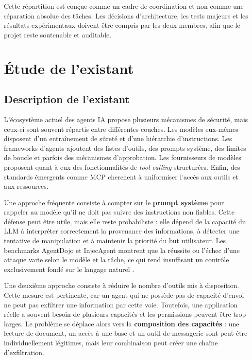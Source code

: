 Cette répartition est conçue comme un cadre de coordination et non comme une séparation absolue des tâches. Les décisions d'architecture, les tests majeurs et les résultats expérimentaux doivent être compris par les deux membres, afin que le projet reste soutenable et auditable.

\section{Étude de l'existant}

\subsection{Description de l'existant}

L'écosystème actuel des agents IA propose plusieurs mécanismes de sécurité, mais ceux-ci sont souvent répartis entre différentes couches. Les modèles eux-mêmes disposent d'un entraînement de sûreté et d'une hiérarchie d'instructions. Les frameworks d'agents ajoutent des listes d'outils, des prompts système, des limites de boucle et parfois des mécanismes d'approbation. Les fournisseurs de modèles proposent quant à eux des fonctionnalités de \textit{tool calling} structurées. Enfin, des standards émergents comme MCP cherchent à uniformiser l'accès aux outils et aux ressources.

Une approche fréquente consiste à compter sur le \textbf{prompt système} pour rappeler au modèle qu'il ne doit pas suivre des instructions non fiables. Cette défense peut être utile, mais elle reste probabiliste : elle dépend de la capacité du LLM à interpréter correctement la provenance des informations, à détecter une tentative de manipulation et à maintenir la priorité du but utilisateur. Les benchmarks AgentDojo et InjecAgent montrent que la réussite ou l'échec d'une attaque varie selon le modèle et la tâche, ce qui rend insuffisant un contrôle exclusivement fondé sur le langage naturel \cite{injecagent,agentdojo}.

Une deuxième approche consiste à réduire le nombre d'outils mis à disposition. Cette mesure est pertinente, car un agent qui ne possède pas de capacité d'envoi ne peut pas exfiltrer une information par cette voie. Toutefois, une application réelle a souvent besoin de plusieurs capacités et les permissions peuvent être trop larges. Le problème se déplace alors vers la \textbf{composition des capacités} : une lecture de document, un accès à une base et un outil de messagerie sont peut-être individuellement légitimes, mais leur combinaison peut créer une chaîne d'exfiltration.

